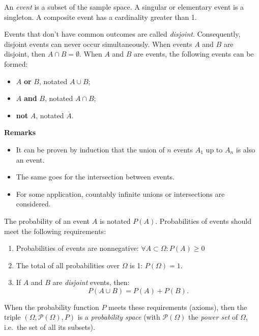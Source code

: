 \begin{definition}[Event]
  An \emph{event} is a subset of the sample space. A singular or elementary event is a singleton. A composite event has a cardinality greater than 1.
\end{definition}

Events that don't have common outcomes are called \emph{disjoint}. Consequently, disjoint events can never occur simultaneously. When events $A$ and $B$ are disjoint, then $A \cap B = \emptyset$. When $A$ and $B$ are events, the following events can be formed:

 \begin{itemize}
  \item $A$ \textbf{or} $B$, notated $A \cup B$;
  \item $A$ \textbf{and} $B$, notated $A \cap B$;
  \item \textbf{not} $A$, notated $\overline{A}$.
\end{itemize}

\textbf{Remarks}
\begin{itemize}
\item It can be proven by induction that the union of $n$ events $A_1$ up to $A_n$ is also an event.
\item The same goes for the intersection between events.
\item For some application, countably infinite unions or intersections are considered.
\end{itemize}

\begin{definition} The probability of an event $A$ is notated $P(A)$. Probabilities of events should meet the following requirements:
  
\begin{enumerate}
  \item Probabilities of events are nonnegative: $\forall A \subset \Omega: P(A) \geq 0$
  \item The total of all probabilities over $\Omega$ is 1: $P(\Omega) = 1.$
  \item If $A$ and $B$ are \emph{disjoint} events, then:
    \[P(A\cup B) = P(A) + P(B). \]
\end{enumerate}

When the probability function $P$ meets these requirements (axioms), then the triple $(\Omega, \mathcal{P}(\Omega), P)$ is a \emph{probability space} (with $\mathcal{P}(\Omega)$ the \emph{power set} of $\Omega$, i.e.~the set of all its subsets).
\end{definition}


